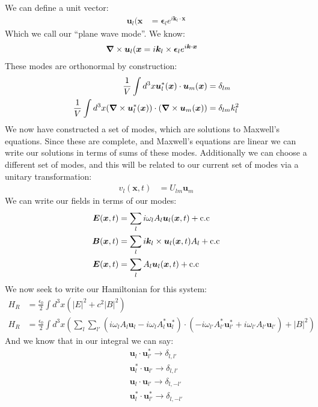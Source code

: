 We can define a unit vector:
\begin{align*}
	\bm{u}_l(\bm{x} &= \bm{\epsilon}_l e^{i\bm{k}_l\cdot\bm{x}}
\end{align*}
Which we call our ``plane wave mode''. We know:
\begin{align*}
	\bm{\nabla}\times\bm{u}_l(\bm{x} &= i\bm{k}_l\times\bm{\epsilon}_l e^{i\bm{k}\cdot\bm{x}}
\end{align*}
These modes are orthonormal by construction:
\begin{align*}
	\frac{1}{V} \int d^3 x\bm{u}_l^*(\bm{x})\cdot\bm{u}_m(\bm{x}) &= \delta_{lm} \\
	\frac{1}{V} \int d^3 x(\bm{\nabla}\times\bm{u}_l^*(\bm{x}))\cdot(\bm{\nabla}\times\bm{u}_m(\bm{x})) &= \delta_{lm}k_l^2
\end{align*}
We now have constructed a set of modes, which are solutions to Maxwell's equations. Since these are complete, and Maxwell's equations are linear we can write our solutions in terms of sums of these modes.
Additionally we can choose a different set of modes, and this will be related to our current set of modes via a unitary transformation:
\begin{align*}
	v_l(\bm{x},t) &= U_{lm} \bm{u}_m
\end{align*}
We can write our fields in terms of our modes:
\begin{align*}
	\bm{E}(\bm{x},t) &= \sum_l i\omega_l A_l \bm{u}_l(\bm{x},t)+\text{c.c} \\
	\bm{B}(\bm{x},t) &= \sum_l i\bm{k}_l\times  \bm{u}_l(\bm{x},t)A_l+\text{c.c} \\
	\bm{E}(\bm{x},t) &= \sum_l A_l \bm{u}_l(\bm{x},t)+\text{c.c}
\end{align*}
We now seek to write our Hamiltonian for this system:
\begin{align*}
	H_R &= \frac{\epsilon_0}{2}\int d^3 x (|E|^2 + c^2|B|^2) \\
	H_R &= \frac{\epsilon_0}{2}\int d^3 x \left( \sum_l\sum_{l'} (i\omega_lA_l\bm{u}_l - i\omega_lA_l^* \bm{u}_l^*)\cdot(-i\omega_{l'}A_{l'}^* \bm{u}_{l'}^* + i\omega_{l'} A_{l'}\bm{u}_{l'}) + |B|^2\right)
\end{align*}
And we know that in our integral we can say:
\begin{align*}
	\bm{u}_l\cdot\bm{u}_{l'}^* \to \delta_{l,l'} \\
	\bm{u}_l^*\cdot\bm{u}_{l'} \to \delta_{l,l'} \\
	\bm{u}_l\cdot\bm{u}_{l'} \to \delta_{l,-l'} \\
	\bm{u}_l^*\cdot\bm{u}_{l'}^* \to \delta_{l,-l'}
\end{align*}
